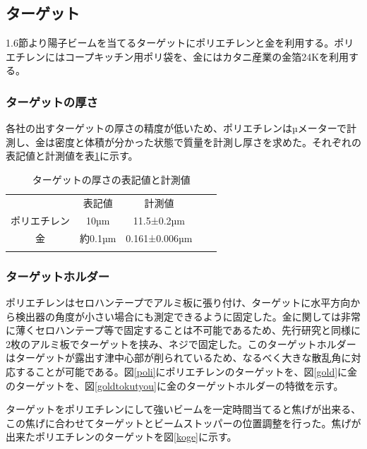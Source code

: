\documentclass[a4paper,11pt,dvipdfmx]{jsarticle}
\begin{document}
\subsection{ターゲット}
1.6節より陽子ビームを当てるターゲットにポリエチレンと金を利用する。ポリエチレンにはコープキッチン用ポリ袋を、金にはカタニ産業の金箔24Kを利用する。

\subsubsection{ターゲットの厚さ}
各社の出すターゲットの厚さの精度が低いため、ポリエチレンはµメーターで計測し、金は密度と体積が分かった状態で質量を計測し厚さを求めた。それぞれの表記値と計測値を表\ref{thickness}に示す。

\begin{table}[H]
 \centering
 \begin{tabular}{cccll}
 \cline{1-3}
  \multicolumn{1}{|c|}{}       & \multicolumn{1}{c|}{表記値}    & \multicolumn{1}{c|}{計測値}           &  &  \\ \cline{1-3}
  \multicolumn{1}{|c|}{ポリエチレン} & \multicolumn{1}{c|}{10µm}   & \multicolumn{1}{c|}{11.5±0.2µm}    &  &  \\ \cline{1-3}
  \multicolumn{1}{|c|}{金}      & \multicolumn{1}{c|}{約0.1µm} & \multicolumn{1}{c|}{0.161±0.006µm} &  &  \\ \cline{1-3}
  \multicolumn{1}{l}{}         & \multicolumn{1}{l}{}        & \multicolumn{1}{l}{}               &  & 
 \end{tabular}
 \caption{ターゲットの厚さの表記値と計測値}
 \label{thickness}
\end{table}

\subsubsection{ターゲットホルダー}
ポリエチレンはセロハンテープでアルミ板に張り付け、ターゲットに水平方向から検出器の角度が小さい場合にも測定できるように固定した。金に関しては非常に薄くセロハンテープ等で固定することは不可能であるため、先行研究と同様に2枚のアルミ板でターゲットを挟み、ネジで固定した。このターゲットホルダーはターゲットが露出す津中心部が削られているため、なるべく大きな散乱角に対応することが可能である。図\ref{poli}にポリエチレンのターゲットを、図\ref{gold}に金のターゲットを、図\ref{goldtokutyou}に金のターゲットホルダーの特徴を示す。
\par
ターゲットをポリエチレンにして強いビームを一定時間当てると焦げが出来る、この焦げに合わせてターゲットとビームストッパーの位置調整を行った。焦げが出来たポリエチレンのターゲットを図\ref{koge}に示す。
\end{document}

